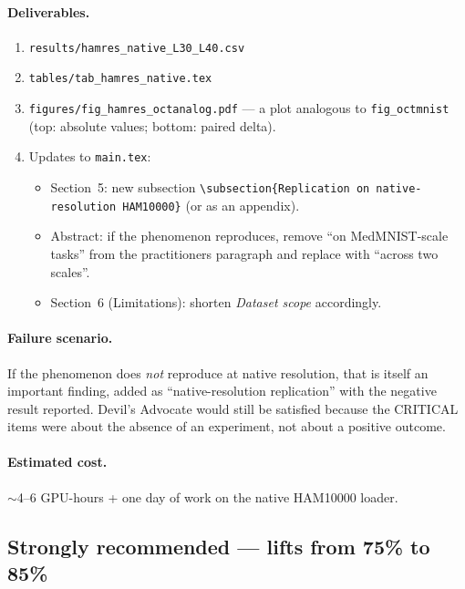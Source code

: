 \documentclass[11pt,a4paper]{article}
\newcommand{\code}[1]{\texttt{#1}}
\newcommand{\file}[1]{\texttt{#1}}
\begin{document}
\paragraph{Deliverables.}
\begin{enumerate}[nosep]
  \item \file{results/hamres\_native\_L30\_L40.csv}
  \item \file{tables/tab\_hamres\_native.tex}
  \item \file{figures/fig\_hamres\_octanalog.pdf} --- a plot analogous to
        \file{fig\_octmnist} (top: absolute values; bottom: paired delta).
  \item Updates to \code{main.tex}:
    \begin{itemize}[nosep]
      \item Section~5: new subsection
            \code{\textbackslash{}subsection\{Replication on
            native-resolution HAM10000\}} (or as an appendix).
      \item Abstract: if the phenomenon reproduces, remove ``on
            MedMNIST-scale tasks'' from the practitioners paragraph and
            replace with ``across two scales''.
      \item Section~6 (Limitations): shorten \textit{Dataset scope}
            accordingly.
    \end{itemize}
\end{enumerate}

\paragraph{Failure scenario.} If the phenomenon does \emph{not} reproduce
at native resolution, that is itself an important finding, added as
``native-resolution replication'' with the negative result reported.
Devil's Advocate would still be satisfied because the CRITICAL items were
about the absence of an experiment, not about a positive outcome.

\paragraph{Estimated cost.} $\sim$4--6 GPU-hours + one day of work on the
native HAM10000 loader.

\subsection*{Strongly recommended --- lifts from 75\% to 85\%}

\end{document}
